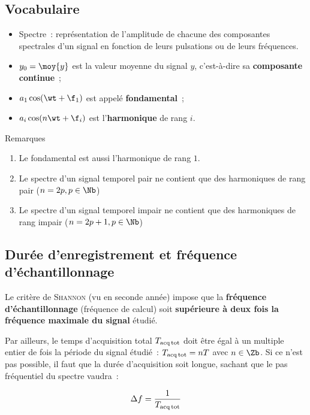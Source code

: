 \documentclass[a4paper, 11pt, final, garamond]{book}
\begin{document}
\subsection{Vocabulaire}

\begin{itemize}
    \item Spectre~: représentation de l'amplitude de chacune des composantes
        spectrales d'un signal en fonction de leurs pulsations ou de leurs
        fréquences.
    \item $y_0 = \moy{y}$ est la valeur moyenne du signal $y$, c'est-à-dire sa
        \textbf{composante continue}~;
    \item $a_1 \cos(\wt + \f_1)$ est appelé
        \textbf{fondamental}~;
    \item $a_i \cos(n\wt + \f_i)$ est l'\textbf{harmonique} de
        rang $i$.
\end{itemize}

\begin{rrema}{Remarques}
    \begin{enumerate}
        \item Le fondamental est aussi l'harmonique de rang $1$.
        \item Le spectre d'un signal temporel pair ne contient que des
            harmoniques de rang pair ($n=2p, p\in\Nb$)
        \item Le spectre d'un signal temporel impair ne contient que des
            harmoniques de rang impair ($n=2p+1, p\in\Nb$)
    \end{enumerate}
\end{rrema}

\subsection{Durée d'enregistrement et fréquence d'échantillonnage}

Le critère de \textsc{Shannon} (vu en seconde année) impose que la
\textbf{fréquence d'échantillonnage} (fréquence de calcul) soit
\textbf{supérieure à deux fois la fréquence maximale du signal} étudié.
\bigbreak

Par ailleurs, le temps d'acquisition total $T_{\rm acq\, tot}$ doit être égal à
un multiple entier de fois la période du signal étudié~: $T_{\rm acq\, tot} =
nT$ avec $n\in \Zb$. Si ce n'est pas possible, il faut que la durée
d'acquisition soit longue, sachant que le pas fréquentiel du spectre vaudra~: 

\[
    \Delta f = \frac{1}{T_{\rm acq\, tot}}
\]
\end{document}
